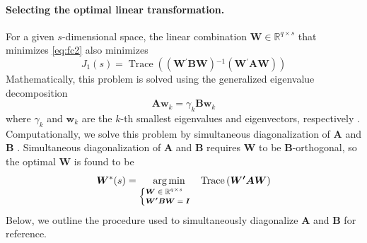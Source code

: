 \documentclass[12pt]{article} %
\newcommand{\al}[1]{{\color{red} #1}}
\newcommand{\inv}{\ensuremath{^{-1}}}
\newcommand{\trans}{\ensuremath{^\prime}}
\DeclareMathOperator{\tr}{Trace}
\DeclareMathOperator*{\argmin}{arg\, min}
\begin{document}
\paragraph{Selecting the optimal linear transformation.}
\al{For a given $s$-dimensional space, the linear combination $\bm{W} \in \mathbb{R}^{q \times s}$ that minimizes \eqref{eq:fc2} also minimizes
%
\begin{equation}\label{eq:minimize}
J_1(s) = \tr\left( \left(\bm{W\trans B W} \right)\inv \left(\bm{W\trans A W}\right) \right)
\end{equation}
%
Mathematically,} this problem is solved using the generalized eigenvalue decomposition
%
\begin{equation}\label{eq:geigen}
	\bm{Aw}_k = \gamma_k \bm{Bw}_k
\end{equation}
%
where $\gamma_k$ and $\bm{w}_k$ are the $k$-th smallest eigenvalues and eigenvectors, respectively \citep{Fukunaga:1990}. 
Computationally, \al{we solve this problem by} simultaneous diagonalization of $\bm{A}$ and $\bm{B}$ \citep{McDonald:1979ca, deLeeuw:1982to}. Simultaneous diagonalization of $\bm{A}$ and $\bm{B}$ requires $\bm{W}$ to be $\bm{B}$-orthogonal, so the optimal $\bm{W}$ is found to be
%
\begin{equation}\label{eq:optimw}
	\bm{W}^*(s) = \argmin_{ 
\begin{scriptsize}
	\begin{cases}
      \bm{W} \in \mathbb{R}^{q \times s} \\
      \bm{W\trans B W} = \bm{I}
	\end{cases}
\end{scriptsize}
	} 
\tr\left( \bm{W\trans A W} \right) 
\end{equation}
%
Below, we outline the procedure used to simultaneously diagonalize $\bm{A}$ and $\bm{B}$ for reference.\\
\end{document}
